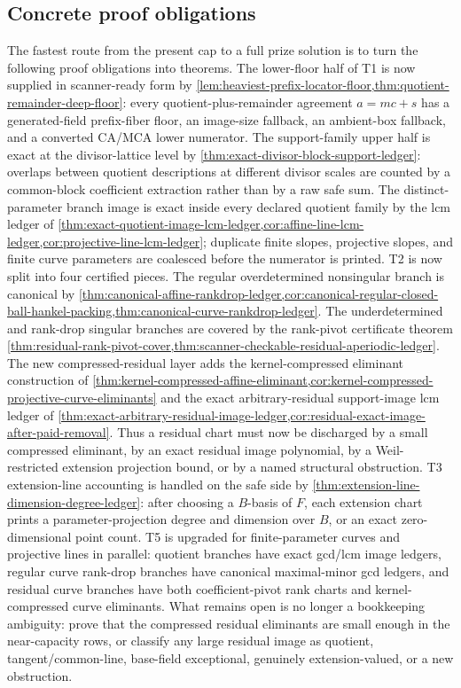 \documentclass[11pt]{article}
\theoremstyle{definition}
\theoremstyle{remark}
\begin{document}
\subsection{Concrete proof obligations}

The fastest route from the present cap to a full prize solution is to turn the
following proof obligations into theorems.  The lower-floor half of T1 is now
supplied in scanner-ready form by
\cref{lem:heaviest-prefix-locator-floor,thm:quotient-remainder-deep-floor}: every
quotient-plus-remainder agreement $a=mc+s$ has a generated-field prefix-fiber
floor, an image-size fallback, an ambient-box fallback, and a converted CA/MCA
lower numerator.  The support-family upper half is exact at the divisor-lattice
level by \cref{thm:exact-divisor-block-support-ledger}: overlaps between quotient
descriptions at different divisor scales are counted by a common-block
coefficient extraction rather than by a raw safe sum.  The distinct-parameter
branch image is exact inside every declared quotient family by the lcm ledger of
\cref{thm:exact-quotient-image-lcm-ledger,cor:affine-line-lcm-ledger,cor:projective-line-lcm-ledger}; duplicate finite slopes, projective slopes, and
finite curve parameters are coalesced before the numerator is printed.  T2 is now
split into four certified pieces.  The regular overdetermined nonsingular branch
is canonical by \cref{thm:canonical-affine-rankdrop-ledger,cor:canonical-regular-closed-ball-hankel-packing,thm:canonical-curve-rankdrop-ledger}.  The underdetermined
and rank-drop singular branches are covered by the rank-pivot certificate theorem
\cref{thm:residual-rank-pivot-cover,thm:scanner-checkable-residual-aperiodic-ledger}.  The new compressed-residual layer adds the kernel-compressed eliminant construction of
\cref{thm:kernel-compressed-affine-eliminant,cor:kernel-compressed-projective-curve-eliminants} and the exact arbitrary-residual support-image lcm ledger of
\cref{thm:exact-arbitrary-residual-image-ledger,cor:residual-exact-image-after-paid-removal}.  Thus a residual chart must now be discharged by a small compressed
eliminant, by an exact residual image polynomial, by a Weil-restricted extension
projection bound, or by a named structural obstruction.  T3 extension-line
accounting is handled on the safe side by
\cref{thm:extension-line-dimension-degree-ledger}: after choosing a $B$-basis of
$F$, each extension chart prints a parameter-projection degree and dimension over
$B$, or an exact zero-dimensional point count.  T5 is upgraded for finite-parameter
curves and projective lines in parallel: quotient branches have exact gcd/lcm
image ledgers, regular curve rank-drop branches have canonical maximal-minor gcd
ledgers, and residual curve branches have both coefficient-pivot rank charts and
kernel-compressed curve eliminants.  What remains open is no longer a bookkeeping
ambiguity: prove that the compressed residual eliminants are small enough in the
near-capacity rows, or classify any large residual image as quotient,
tangent/common-line, base-field exceptional, genuinely extension-valued, or a new
obstruction.
\end{document}
